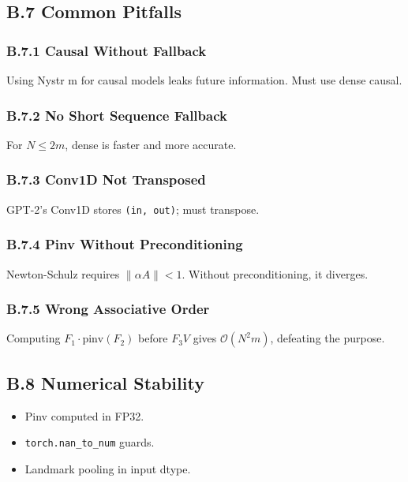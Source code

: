 \subsection{B.7 Common Pitfalls}

\subsubsection{B.7.1 Causal Without Fallback}

Using Nystr m for causal models leaks future information. Must use 
dense causal.

\subsubsection{B.7.2 No Short Sequence Fallback}

For $N \leq 2m$, dense is faster and more accurate.

\subsubsection{B.7.3 Conv1D Not Transposed}

GPT-2's Conv1D stores \texttt{(in, out)}; must transpose.

\subsubsection{B.7.4 Pinv Without Preconditioning}

Newton-Schulz requires $\|\alpha A\| < 1$. Without preconditioning, it 
diverges.

\subsubsection{B.7.5 Wrong Associative Order}

Computing $F_1 \cdot \text{pinv}(F_2)$ before $F_3 V$ gives $\mathcal{O}(N^2 m)$, 
defeating the purpose.

\subsection{B.8 Numerical Stability}

\begin{itemize}
\item Pinv computed in FP32.
\item \texttt{torch.nan\_to\_num} guards.
\item Landmark pooling in input dtype.

\end{itemize}
